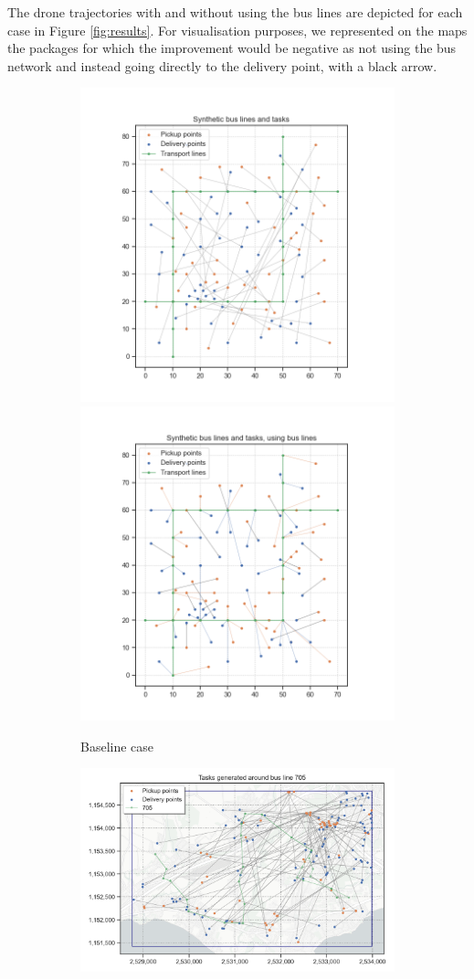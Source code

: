 The drone trajectories with and without using the bus lines are depicted for each case in Figure \ref{fig:results}. For visualisation purposes, we represented on the maps the packages for which the improvement would be negative as not using the bus network and instead going directly to the delivery point, with a black arrow.

\begin{figure}
    \centering
    \begin{subfigure}{\linewidth}
        \centering
        \includegraphics[width=0.49\linewidth]{../fig/synthetic_tasks.png}
        \includegraphics[width=0.49\linewidth]{../fig/synthetic_tasks_bus.png}
        \caption{Baseline case}        
    \end{subfigure}
    \begin{subfigure}{\linewidth}
        \includegraphics[width=0.49\linewidth]{../fig/l705_tasks.png}

\end{subfigure}
\end{figure}
